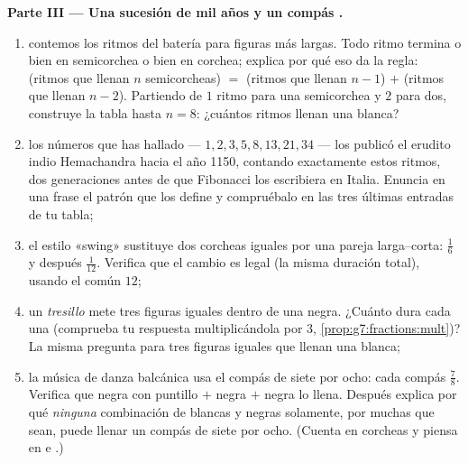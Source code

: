 \begin{problem}
\medskip
\noindent\textbf{Parte III --- Una sucesión de mil años y un compás
.}
\begin{enumerate}[resume]
  \item contemos los ritmos del batería para figuras más largas.
        Todo ritmo termina o bien en semicorchea o bien en
        corchea; explica por qué eso da la regla: (ritmos que
        llenan $n$ semicorcheas) $=$ (ritmos que llenan $n - 1$)
        $+$ (ritmos que llenan $n - 2$). Partiendo de $1$ ritmo
        para una semicorchea y $2$ para dos, construye la tabla hasta
        $n = 8$: ¿cuántos ritmos llenan una blanca?
  \item los números que has hallado --- $1, 2, 3, 5, 8, 13, 21, 34$ ---
        los publicó el erudito indio Hemachandra
        hacia el año 1150, contando exactamente estos ritmos, dos
        generaciones antes de que Fibonacci los escribiera en Italia.
        Enuncia en una frase el patrón que los define y compruébalo
        en las tres últimas entradas de tu tabla;
  \item el estilo «swing» sustituye dos corcheas iguales por una pareja
        larga--corta: $\frac16$ y después $\frac{1}{12}$. Verifica
        que el cambio es legal (la misma duración total), usando el
         común $12$;
  \item un \emph{tresillo} mete tres figuras iguales dentro de una
        negra. ¿Cuánto dura cada una (comprueba tu respuesta
        multiplicándola por $3$,
        \cref{prop:g7:fractions:mult})? La misma pregunta para tres
        figuras iguales que llenan una blanca;
  \item la música de danza balcánica usa el compás de siete por ocho: cada compás
         $\frac78$. Verifica que negra con puntillo $+$ negra
        $+$ negra lo llena. Después explica por qué \emph{ninguna}
        combinación de blancas y negras solamente,
        por muchas que sean, puede llenar un compás de siete por ocho.
        (Cuenta en corcheas y piensa en  e .)
\end{enumerate}
\end{problem}
